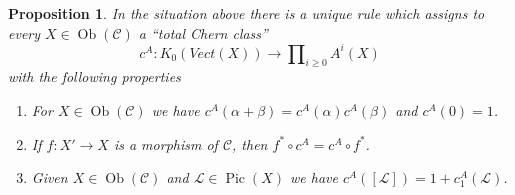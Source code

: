 \documentclass[10pt,a4paper]{amsart}
\theoremstyle{plain}
\newtheorem{proposition}[subsection]{Proposition}
\theoremstyle{definition}
\theoremstyle{remark}
\numberwithin{equation}{subsection}
\def\Ob{\mathop{\mathrm{Ob}}\nolimits}
\def\Pic{\mathop{\mathrm{Pic}}\nolimits}
\begin{document}
\begin{proposition}
\label{proposition-chern-class}
In the situation above there is a unique rule which assigns to
every $X \in \Ob(\mathcal{C})$ a ``total Chern class''
$$
c^A : K_0(\textit{Vect}(X)) \longrightarrow  \prod\nolimits_{i \geq 0} A^i(X)
$$
with the following properties
\begin{enumerate}
\item For $X \in \Ob(\mathcal{C})$ we have
$c^A(\alpha + \beta) = c^A(\alpha) c^A(\beta)$
and $c^A(0) = 1$.
\item If $f : X' \to X$ is a morphism of $\mathcal{C}$, then
$f^* \circ c^A =  c^A \circ f^*$.
\item Given $X \in \Ob(\mathcal{C})$ and $\mathcal{L} \in \Pic(X)$
we have $c^A([\mathcal{L}]) = 1 + c_1^A(\mathcal{L})$.
\end{enumerate}
\end{proposition}
\end{document}
